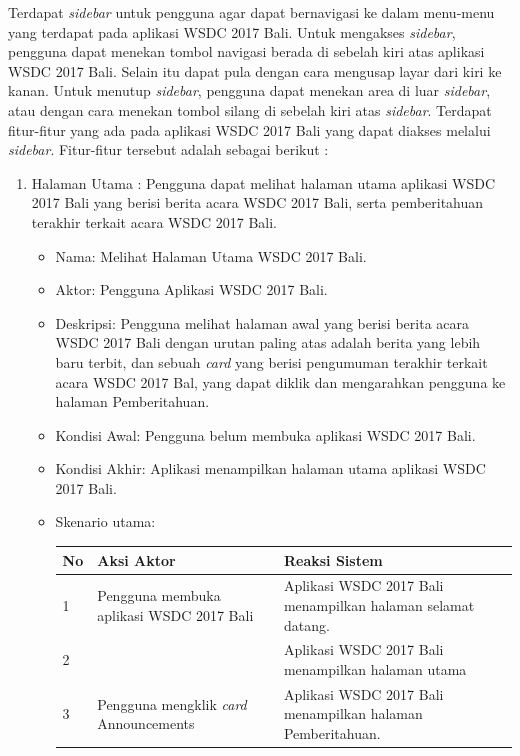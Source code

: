 Terdapat {\it sidebar} untuk pengguna agar dapat bernavigasi ke dalam menu-menu yang terdapat pada aplikasi WSDC 2017 Bali. Untuk mengakses {\it sidebar}, pengguna dapat menekan tombol navigasi berada di sebelah kiri atas aplikasi WSDC 2017 Bali. Selain itu dapat pula dengan cara mengusap layar dari kiri ke kanan. Untuk menutup {\it sidebar}, pengguna dapat menekan area di luar {\it sidebar}, atau dengan cara menekan tombol silang di sebelah kiri atas {\it sidebar}. Terdapat fitur-fitur yang ada pada aplikasi WSDC 2017 Bali yang dapat diakses melalui {\it sidebar}. Fitur-fitur tersebut adalah sebagai berikut :
\begin{enumerate}
	\item Halaman Utama : Pengguna dapat melihat halaman utama aplikasi WSDC 2017 Bali yang berisi berita acara WSDC 2017 Bali, serta pemberitahuan terakhir terkait acara WSDC 2017 Bali.
	\begin{itemize}
		\item Nama: Melihat Halaman Utama WSDC 2017 Bali.
		\item Aktor: Pengguna Aplikasi WSDC 2017 Bali.
		\item Deskripsi: Pengguna melihat halaman awal yang berisi berita acara WSDC 2017 Bali dengan urutan paling atas adalah berita yang lebih baru terbit, dan sebuah {\it card} yang berisi pengumuman terakhir terkait acara WSDC 2017 Bal, yang dapat diklik dan mengarahkan pengguna ke halaman Pemberitahuan.
		\item Kondisi Awal: Pengguna belum membuka aplikasi WSDC 2017 Bali.
		\item Kondisi Akhir: Aplikasi menampilkan halaman utama aplikasi WSDC 2017 Bali.
		\item Skenario utama:\\
		\begin{table}[H]
			\centering
			\begin{tabular}{|p{0.5cm}|p{7cm}|p{7cm}|}
				\hline
				No & Aksi Aktor                               & Reaksi Sistem                                          \\ \hline
				1  & Pengguna membuka aplikasi WSDC 2017 Bali & Aplikasi WSDC 2017 Bali menampilkan halaman selamat datang. \\ \hline
				2  &                                          & Aplikasi WSDC 2017 Bali menampilkan halaman utama           \\ \hline
				3  & Pengguna mengklik {\it card} Announcements & Aplikasi WSDC 2017 Bali menampilkan halaman Pemberitahuan. \\ \hline

\end{tabular}
\end{table}
\end{itemize}
\end{enumerate}
